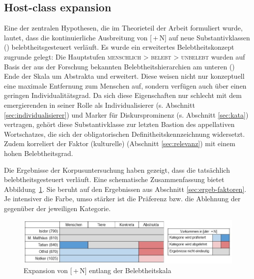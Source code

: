 \subsection{Host-class expansion}

Eine der zentralen Hypothesen, die im Theorieteil der Arbeit formuliert wurde, lautet, dass die kontinuierliche Ausbreitung von [\,+\,N] auf neue Substantivklassen ()  belebtheitsgesteuert  verläuft. Es wurde ein erweitertes Belebtheitskonzept  zugrunde gelegt: Die Hauptstufen \textsc{menschlich > belebt > unbelebt} wurden auf Basis der aus der Forschung bekannten Belebtheitshierarchien  \parencite[u.a.][]{Comrie1989,Yamamoto1999,Croft2006,Enger2011} am unteren () Ende der Skala um Abstrakta  und  erweitert. Diese weisen nicht nur konzeptuell eine maximale Entfernung zum Menschen auf, sondern verfügen auch über einen geringen  Individualitätsgrad. Da sich diese Eigenschaften nur schlecht mit dem emergierenden  in seiner Rolle als Individualisierer  (s. Abschnitt \ref{sec:individualisierer}) und Marker für Diskursprominenz (s. Abschnitt \ref{sec:kata}) vertragen, gehört diese Substantivklasse zur letzten Bastion des appellativen  Wortschatzes, die sich der obligatorischen Definitheitskennzeichnung widersetzt. Zudem korreliert der Faktor (kulturelle)  (Abschnitt \ref{sec:relevanz}) mit einem hohen  Belebtheitsgrad. 

Die Ergebnisse der Korpusuntersuchung  haben gezeigt, dass die  tatsächlich belebtheitsgesteuert  verläuft. Eine schematische Zusammenfassung bietet Abbildung~\ref{abb:expansion-belebtheit}. Sie beruht auf den Ergebnissen aus Abschnitt \ref{sec:ergeb-faktoren}. Je intensiver die Farbe, umso stärker ist die Präferenz bzw. die Ablehnung der gegenüber der jeweiligen Kategorie. 

\begin{figure}
  \includegraphics[width=\textwidth]{images/belebtheitsexpansion-neu.jpg}
\caption {Expansion von [\,+\,N] entlang der Belebtheitskala\label{abb:expansion-belebtheit}} 
\end{figure} 
  
